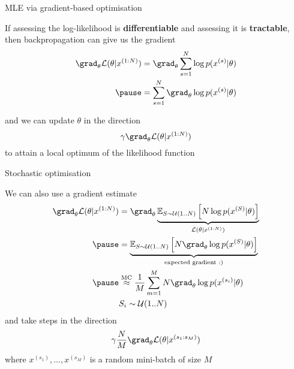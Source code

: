 \begin{frame}{MLE via gradient-based optimisation}

If assessing the log-likelihood is {\bf differentiable} and assessing it is {\bf tractable}, then backpropagation can give us the gradient
\begin{equation*}
\begin{aligned}
\grad_\theta \mathcal L(\theta|x^{(1:N)}) &= \grad_\theta \sum_{s=1}^N \log p(x^{(s)}|\theta) \\ \pause
 &=  \sum_{s=1}^N \grad_\theta \log p(x^{(s)}|\theta)
\end{aligned}
\end{equation*}  \pause

and we can update $\theta$ in the direction
\begin{equation*}
\gamma \grad_\theta \mathcal L(\theta|x^{(1:N)})
\end{equation*}
to attain a local optimum of the likelihood function

\end{frame}

\begin{frame}[plain]{Stochastic optimisation}

We can also use a gradient estimate 
\begin{equation*}
\begin{aligned}
\grad_\theta \mathcal L(\theta|x^{(1:N)}) &= \grad_\theta \underbrace{\mathbb E_{S\sim \mathcal U(1..N)}\left[ N \log p(x^{(S)}|\theta)\right]}_{\mathcal L(\theta|x^{(1:N)})} \\ \pause
 &=  \underbrace{\mathbb E_{S\sim \mathcal U(1..N)}\left[ N \grad_\theta  \log p(x^{(S)}|\theta)\right]}_{\text{expected gradient :)}} \\ \pause
 &\overset{\text{MC}}{\approx} \frac{1}{M} \sum_{m=1}^M N  \grad_\theta \log p(x^{(s_i)}|\theta) \\
 &S_i \sim \mathcal U(1..N)
\end{aligned}
\end{equation*}  \pause
and take steps in the direction
\begin{equation*}
\gamma \frac{N}{M} \grad_\theta \mathcal L(\theta|x^{(s_1:s_M)})
\end{equation*}
where $x^{(s_1)}, \ldots, x^{(s_M)}$ is a random mini-batch of size $M$


\end{frame}




